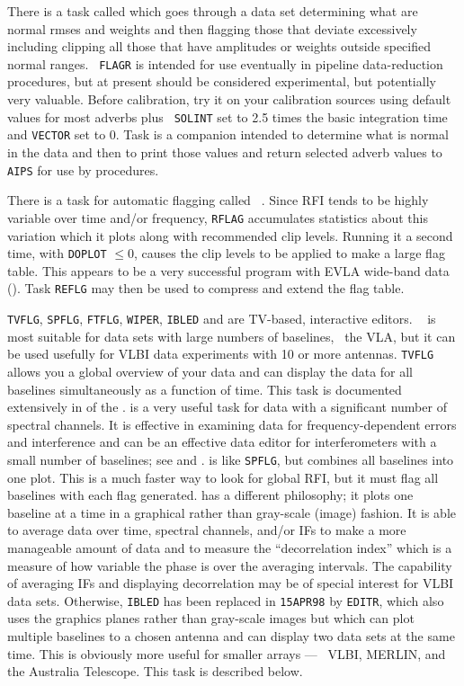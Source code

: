      There is a task called {\tt {}} which goes through a
data set determining what are normal rmses and weights and then
flagging those that deviate excessively including clipping all those
that have amplitudes or weights outside specified normal ranges.  {\tt
FLAGR} is intended for use eventually in pipeline data-reduction
procedures, but at present should be considered experimental, but
potentially very valuable.  Before calibration, try it on your
calibration sources using default values for most adverbs plus {\tt
SOLINT} set to 2.5 times the basic integration time and {\tt VECTOR}
set to 0.  Task {\tt {}} is a companion intended to
determine what is normal in the data and then to print those values
and return selected adverb values to {\tt AIPS} for use by procedures.

    There is a task for automatic flagging called {\tt
{}}\@.  Since RFI tends to be highly variable over time
and/or frequency, {\tt RFLAG} accumulates statistics about this
variation which it plots along with recommended clip levels.  Running
it a second time, with {\tt DOPLOT} $\leq 0$, causes the clip levels
to be applied to make a large flag table.  This appears to be a very
successful program with EVLA wide-band data ().  Task
{\tt REFLG} may then be used to compress and extend the flag table.

    {\tt TVFLG}, {\tt SPFLG}, {\tt FTFLG}, {\tt WIPER}, {\tt IBLED}
and {\tt {}} are TV-based, interactive editors.  {\tt
{}} is most suitable for data sets with large numbers of
baselines, \eg\ the VLA, but it can be used usefully for VLBI data
experiments with 10 or more antennas.  {\tt TVFLG} allows you a global
overview of your data and can display the data for all baselines
simultaneously as a function of time.  This task is documented
extensively in  of the \Cookbook.  {\tt {}} is a
very useful task for data with a significant number of spectral
channels.  It is effective in examining data for frequency-dependent
errors and interference and can be an effective data editor for
interferometers with a small number of baselines; see  and
.  {\tt {}} is like {\tt SPFLG}, but combines
all baselines into one plot.  This is a much faster way to look for
global RFI, but it must flag all baselines with each flag generated.
{\tt {}}  has a different philosophy; it plots one baseline
at a time in a graphical rather than gray-scale (image) fashion.  It
is able to average data over time, spectral channels, and/or IFs to
make a more manageable amount of data and to measure the
``decorrelation index'' which is a measure of how variable the phase
is over the averaging intervals. The capability of averaging IFs and
displaying decorrelation may be of special interest for VLBI data
sets.  Otherwise, {\tt IBLED} has been replaced in {\tt 15APR98} by
{\tt EDITR}, which also uses the graphics planes rather than
gray-scale images but which can plot multiple baselines to a chosen
antenna and can display two data sets at the same time.  This is
obviously more useful for smaller arrays ---  \eg\ VLBI, MERLIN,  and
the Australia Telescope. This task is described below.

